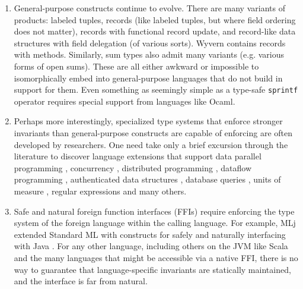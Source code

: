\begin{enumerate}
\item General-purpose constructs continue to evolve. There are many  variants of products: labeled tuples, records (like labeled tuples, but where field ordering does not matter), records with functional record update, and record-like data structures with field delegation (of various sorts). Wyvern contains records with methods. Similarly, sum types also admit many variants (e.g. various forms of open sums). These are all either awkward or impossible to isomorphically embed into general-purpose languages that do not build in support for them. Even something as seemingly simple as a type-safe \verb|sprintf| operator requires special support from languages like Ocaml.
\item Perhaps more interestingly, specialized type systems that enforce stronger invariants than general-purpose constructs are capable of enforcing are often developed by researchers. One need take only a brief  excursion through the literature to discover language extensions that support data parallel programming \cite{Blelloch93,chakravarty2007data}, concurrency \cite{reppy1993concurrent}, distributed programming \cite{Murphy:2007:TDP:1793574.1793585}, dataflow programming \cite{mandel2005reactiveml}, authenticated data structures \cite{Miller:2014:ADS:2535838.2535851}, database queries \cite{Ohori:2011:MSM:2034773.2034815},  units of measure \cite{conf/cefp/Kennedy09}, regular expressions \cite{fulton-thesis} and many others.%
\item Safe and natural foreign function interfaces (FFIs) require enforcing the type system of the foreign language within the calling language. %
For example, MLj extended Standard ML with constructs for safely and naturally interfacing with Java \cite{Benton:1999:IWW:317636.317791}. For any other language, including  others on the JVM like Scala and the many languages that might be accessible via a native FFI, there is no way to guarantee that language-specific invariants are statically maintained, and the interface is far from natural.
\end{enumerate}


